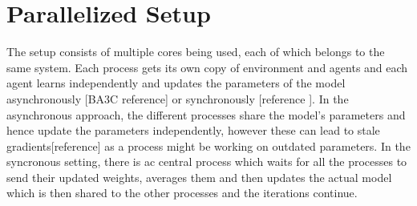 \documentclass[12pt,a4]{article}
\begin{document}
\section*{Parallelized Setup}
The setup consists of multiple cores being used, each of which belongs to the same system. Each process gets its own copy of environment and agents and each agent learns independently and updates the parameters of the model asynchronously [BA3C reference] or synchronously [reference ]. In the asynchronous approach, the different processes share the model's parameters and hence update the parameters independently, however these can lead to stale gradients[reference] as a process might be working on outdated parameters. In the syncronous setting, there is ac central process which waits for all the processes to send their updated weights, averages them and then  updates the actual model which is then shared to the other processes and the iterations continue.
\end{document}
